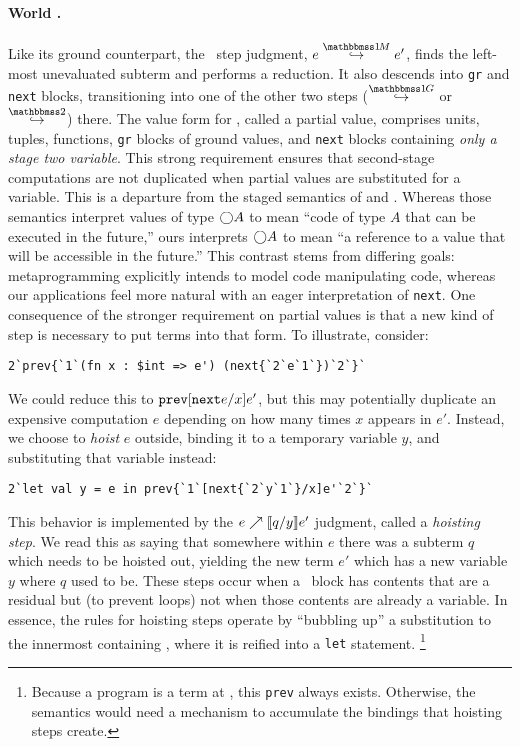 \begin{abstrsyn}
\paragraph{World \bbonem.}
Like its ground counterpart, the \bbonem\ step judgment, $\stepmix e {e'}$, finds the left-most unevaluated subterm and performs a reduction.
It also descends into {\tt gr} and {\tt next} blocks, transitioning into one of the other two steps ($\stepsym \bbonep$ or $\stepsym \bbtwo$) there. 
The value form for \bbonem, called a partial value, comprises units, tuples, functions, {\tt gr} blocks of ground values, and {\tt next} blocks containing \emph{only a stage two variable}.
This strong requirement ensures that second-stage computations are not duplicated 
when partial values are substituted for a variable.
This is a departure from the staged semantics of \cite{taha-thesis-99} and \cite{davies96}.
Whereas those semantics interpret values of type $\bigcirc A$ to mean ``code of type $A$ that can be executed in the future,''
ours interprets $\bigcirc A$ to mean ``a reference to a value that will be accessible in the future.''
This contrast stems from differing goals: metaprogramming explicitly intends to model code manipulating code,
whereas our applications feel more natural with an eager interpretation of {\tt next}.
One consequence of the stronger requirement on partial values is that a new kind of step is necessary to put terms into that form.
To illustrate, consider:
\begin{lstlisting}
2`prev{`1`(fn x : $int => e') (next{`2`e`1`})`2`}`
\end{lstlisting}
We could reduce this to ${\tt prev}{[{\tt next} e/x]e'}$, but this may potentially duplicate an
expensive computation $e$ depending on how many times $x$ appears in $e'$. 
Instead, we choose to \emph{hoist} $e$ outside, binding it
to a temporary variable $y$, and substituting that variable instead:
\begin{lstlisting} 
2`let val y = e in prev{`1`[next{`2`y`1`}/x]e'`2`}`
\end{lstlisting}\end{abstrsyn}
This behavior is implemented by the ${e}\nearrow \llbracket q/y \rrbracket{e'}$ judgment, called a \emph{hoisting step}.
We read this as saying that somewhere within $e$ there was a subterm $q$ which needs to be hoisted out,
yielding the new term $e'$ which has a new variable $y$ where $q$ used to be.
These steps occur when a \next\ block has contents that are a residual but (to prevent loops) not when those contents are already a variable.
In essence, the rules for hoisting steps operate by ``bubbling up'' a substitution to the innermost containing \prev,
where it is reified into a {\tt let} statement.
\footnote{Because a program is a term at \bbtwo, this {\tt prev} always exists.
Otherwise, the semantics would need a mechanism to accumulate the bindings that hoisting steps create.}

